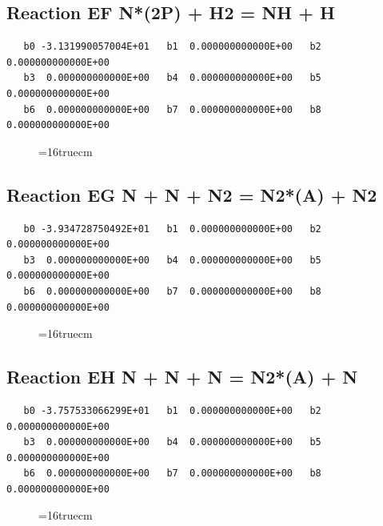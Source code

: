 \documentclass[12pt,dvipdfm]{article}
\begin{document}
\subsection{
Reaction EF N*(2P) + H2 = NH + H }
\begin{small}\begin{verbatim}
   b0 -3.131990057004E+01   b1  0.000000000000E+00   b2  0.000000000000E+00
   b3  0.000000000000E+00   b4  0.000000000000E+00   b5  0.000000000000E+00
   b6  0.000000000000E+00   b7  0.000000000000E+00   b8  0.000000000000E+00
\end{verbatim}\end{small}
\begin{figure}[h!] \label{n2rates}
\epsfxsize=16truecm
\end{figure}
\newpage

\subsection{
Reaction EG N + N + N2 = N2*(A) + N2 }
\begin{small}\begin{verbatim}
   b0 -3.934728750492E+01   b1  0.000000000000E+00   b2  0.000000000000E+00
   b3  0.000000000000E+00   b4  0.000000000000E+00   b5  0.000000000000E+00
   b6  0.000000000000E+00   b7  0.000000000000E+00   b8  0.000000000000E+00
\end{verbatim}\end{small}
\begin{figure}[h!] \label{n2rates}
\epsfxsize=16truecm
\end{figure}
\newpage

\subsection{
Reaction EH N + N + N = N2*(A) + N }
\begin{small}\begin{verbatim}
   b0 -3.757533066299E+01   b1  0.000000000000E+00   b2  0.000000000000E+00
   b3  0.000000000000E+00   b4  0.000000000000E+00   b5  0.000000000000E+00
   b6  0.000000000000E+00   b7  0.000000000000E+00   b8  0.000000000000E+00
\end{verbatim}\end{small}
\begin{figure}[h!] \label{n2rates}
\epsfxsize=16truecm
\end{figure}
\newpage
\end{document}
